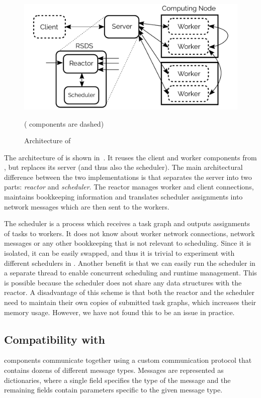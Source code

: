 \begin{figure}[h]
	\centering
	\includegraphics[width=0.6\linewidth]{./imgs/rsds/rsds-architecture}
	\caption{Architecture of \rsds{}}
	(\dask{} components are dashed)
	\label{fig:rsds-architecture}
\end{figure}

The architecture of \rsds{} is shown in~. It reuses
the client and worker components from \dask{}, but replaces its server (and
thus also the scheduler). The main architectural difference between the two implementations is that
\rsds{} separates the server into two parts: \emph{reactor} and
\emph{scheduler}. The reactor manages worker and client connections, maintains
bookkeeping information and translates scheduler assignments into \dask{}
network messages which are then sent to the workers.

The scheduler is a process which receives a task graph and outputs assignments of tasks to workers.
It does not know about worker network connections, \dask{} network messages or
any other bookkeeping that is not relevant to scheduling. Since it is isolated, it can be easily
swapped, and thus it is trivial to experiment with different schedulers in
\rsds{}. Another benefit is that we can easily run the scheduler in a separate
thread to enable concurrent scheduling and runtime management. This is possible because the
scheduler does not share any data structures with the reactor. A disadvantage of this scheme is
that both the reactor and the scheduler need to maintain their own copies of submitted task graphs,
which increases their memory usage. However, we have not found this to be an issue in practice.

\subsection*{Compatibility with \dask{}}
\dask{} components communicate together using a custom
communication protocol that contains dozens of different message types. Messages are represented as
dictionaries, where a single field specifies the type of the message and the remaining fields
contain parameters specific to the given message type.

